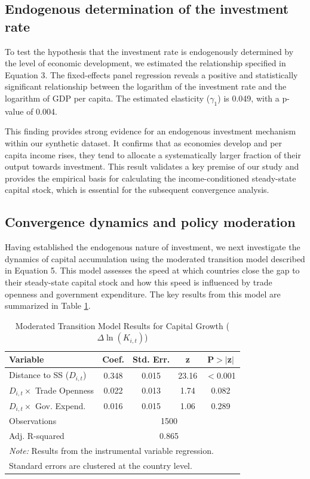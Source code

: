 \documentclass[]{article}
\begin{document}
\subsection{Endogenous determination of the investment rate}
To test the hypothesis that the investment rate is endogenously determined by the level of economic development, we estimated the relationship specified in Equation 3. The fixed-effects panel regression reveals a positive and statistically significant relationship between the logarithm of the investment rate and the logarithm of GDP per capita. The estimated elasticity ($\gamma_1$) is 0.049, with a p-value of 0.004.

This finding provides strong evidence for an endogenous investment mechanism within our synthetic dataset. It confirms that as economies develop and per capita income rises, they tend to allocate a systematically larger fraction of their output towards investment. This result validates a key premise of our study and provides the empirical basis for calculating the income-conditioned steady-state capital stock, which is essential for the subsequent convergence analysis.

\subsection{Convergence dynamics and policy moderation}
Having established the endogenous nature of investment, we next investigate the dynamics of capital accumulation using the moderated transition model described in Equation 5. This model assesses the speed at which countries close the gap to their steady-state capital stock and how this speed is influenced by trade openness and government expenditure. The key results from this model are summarized in Table \ref{tab:moderation_results}.

\begin{table}[h!]
\centering
\caption{Moderated Transition Model Results for Capital Growth ($\Delta \ln(K_{i,t})$)}
\label{tab:moderation_results}
\begin{tabular}{lcccc}
\hline
\hline
Variable & Coef. & Std. Err. & z & P$>$$|$z$|$ \\
\hline
Distance to SS ($D_{i,t}$) & 0.348 & 0.015 & 23.16 & $<$0.001 \\
$D_{i,t} \times$ Trade Openness & 0.022 & 0.013 & 1.74 & 0.082 \\
$D_{i,t} \times$ Gov. Expend. & 0.016 & 0.015 & 1.06 & 0.289 \\
\hline
Observations & \multicolumn{4}{c}{1500} \\
Adj. R-squared & \multicolumn{4}{c}{0.865} \\
\hline
\multicolumn{5}{l}{\footnotesize \textit{Note:} Results from the instrumental variable regression. }\\
\multicolumn{5}{l}{\footnotesize Standard errors are clustered at the country level.}
\end{tabular}
\end{table}
\end{document}
